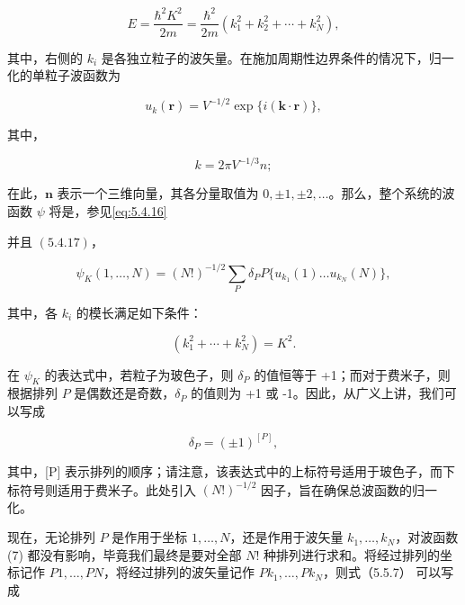 \begin{equation}\tag{5.4.24}\label{eq:5.4.24}
E = \frac { \hbar ^{2} K ^{2} } { 2 m } = \frac { \hbar ^{2} } { 2 m } ( k _ { 1 } ^{2} + k _ { 2 } ^{2} + \cdots + k _ { N } ^{2} ) ,
\end{equation}

其中，右侧的 \(k_{i}\) 是各独立粒子的波矢量。在施加周期性边界条件的情况下，归一化的单粒子波函数为

\begin{equation}\tag{5.4.25}\label{eq:5.4.25}
u _ { k } ( \pmb { r } ) = V ^{- 1 / 2} \exp \{ i ( \pmb { k } \cdot \pmb { r } ) \} ,
\end{equation}

其中，

\begin{equation}\tag{5.4.26}\label{eq:5.4.26}
k = 2 \pi V ^{- 1 / 3} n ;
\end{equation}

在此，\(\boldsymbol{n}\) 表示一个三维向量，其各分量取值为 \(0, \pm1, \pm2, \ldots\)。那么，整个系统的波函数 \(\psi\) 将是，参见\autoref{eq:5.4.16}

并且 \((5.4.17)\)，

\begin{equation}\tag{5.4.27}\label{eq:5.4.27}
\psi _ { K } ( 1 , \ldots , N ) = ( N ! ) ^{- 1 / 2} \sum _ { P } \delta _ { P } P \{ u _ { k _ { 1 } } ( 1 ) \ldots u _ { k _ { N } } ( N ) \} ,
\end{equation}

其中，各 \(k_{i}\) 的模长满足如下条件：

\begin{equation}\tag{5.4.28}\label{eq:5.4.28}
( k _ { 1 } ^{2} + \cdots + k _ { N } ^{2} ) = K ^{2} .
\end{equation}

在 \(\psi_{K}\) 的表达式中，若粒子为玻色子，则 \(\delta_{P}\) 的值恒等于 +1；而对于费米子，则根据排列 \(P\) 是偶数还是奇数，\(\delta_{P}\) 的值则为 +1 或 -1。因此，从广义上讲，我们可以写成

\begin{equation}\tag{5.4.29}\label{eq:5.4.29}
\delta _ { P } = ( \pm 1 ) ^{[ P ]} ,
\end{equation}

其中，{[}P{]} 表示排列的顺序；请注意，该表达式中的上标符号适用于玻色子，而下标符号则适用于费米子。此处引入 \((N!)^{-1/2}\) 因子，旨在确保总波函数的归一化。

现在，无论排列 \(P\) 是作用于坐标 \(1,\ldots,N\)，还是作用于波矢量 \(k_1,\ldots,k_N\)，对波函数 (7) 都没有影响，毕竟我们最终是要对全部 \(N!\) 种排列进行求和。将经过排列的坐标记作 \(P1,\ldots,PN\)，将经过排列的波矢量记作 \(Pk_1,\ldots,Pk_N\)，则式（5.5.7） 可以写成


